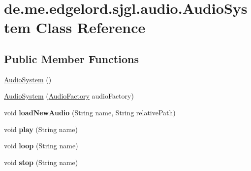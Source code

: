 \hypertarget{classde_1_1me_1_1edgelord_1_1sjgl_1_1audio_1_1_audio_system}{}\section{de.\+me.\+edgelord.\+sjgl.\+audio.\+Audio\+System Class Reference}
\label{classde_1_1me_1_1edgelord_1_1sjgl_1_1audio_1_1_audio_system}
\subsection*{Public Member Functions}
\begin{DoxyCompactItemize}
\item 
\mbox{\hyperlink{classde_1_1me_1_1edgelord_1_1sjgl_1_1audio_1_1_audio_system_a32ecdc18393cafddf6195195ac1be202}{Audio\+System}} ()
\item 
\mbox{\hyperlink{classde_1_1me_1_1edgelord_1_1sjgl_1_1audio_1_1_audio_system_a332604b3b6fce17335bf6180ba15dd9b}{Audio\+System}} (\mbox{\hyperlink{classde_1_1me_1_1edgelord_1_1sjgl_1_1factory_1_1_audio_factory}{Audio\+Factory}} audio\+Factory)
\item 
\mbox{\label{classde_1_1me_1_1edgelord_1_1sjgl_1_1audio_1_1_audio_system_a582620714de0dba106d61a4f124ec98e}} 
void {\bfseries load\+New\+Audio} (String name, String relative\+Path)
\item 
\mbox{\label{classde_1_1me_1_1edgelord_1_1sjgl_1_1audio_1_1_audio_system_a60f7bfbf06d563fa48ca7c576508ff6a}} 
void {\bfseries play} (String name)
\item 
\mbox{\label{classde_1_1me_1_1edgelord_1_1sjgl_1_1audio_1_1_audio_system_a54fb3b524cd02fb3da15d2ec4ac3c621}} 
void {\bfseries loop} (String name)
\item 
\mbox{\label{classde_1_1me_1_1edgelord_1_1sjgl_1_1audio_1_1_audio_system_a532ddedf81dc10e84f1a42de07f8dd41}} 
void {\bfseries stop} (String name)
\item 
\mbox{\label{classde_1_1me_1_1edgelord_1_1sjgl_1_1audio_1_1_audio_system_ae993e182cd1fbd5b0e673b530a4ed9b7}} 

\end{DoxyCompactItemize}
